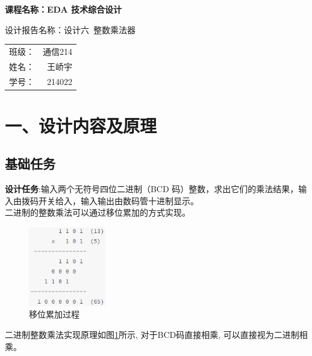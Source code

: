 \documentclass{article}
\newcommand{\fourhao}{\fontsize{14pt}{\baselineskip}\selectfont} %
\newcommand{\xiaosihao}{\fontsize{12pt}{\baselineskip}\selectfont} %
\begin{document}
\begin{titlepage}
    \centering
    \vspace*{2cm}

    \Huge
    \textbf{课程名称：EDA 技术综合设计}

    \vspace{2cm}

    \LARGE
    设计报告名称：设计六\ 整数乘法器

    \vspace{4cm}

    \centering
    \Large
    \begin{tabular}{rl}
        班级： & 通信214    \\
        姓名： & \ 王峤宇    \\
        学号： & \ 214022
    \end{tabular}

    \vfill

    \vspace{1cm}
\end{titlepage}

\newpage
\section*{\fourhao 一、设计内容及原理}
\xiaosihao
{}
\subsection*{基础任务}
\textbf{设计任务}:输入两个无符号四位二进制（BCD 码）整数，求出它们的乘法结果，输入由拨码开关给入，输入输出由数码管十进制显示。\\
二进制的整数乘法可以通过移位累加的方式实现。
\begin{figure}[htbp]
    \centering
    \includegraphics[width=0.3\textwidth]{image/2024-06-20-18-08-28.png}
    \caption{移位累加过程}
    \label{image_design_1}
\end{figure}
二进制整数乘法实现原理如图\ref{image_design_1}所示, 对于BCD码直接相乘, 可以直接视为二进制相乘。
\end{document}
